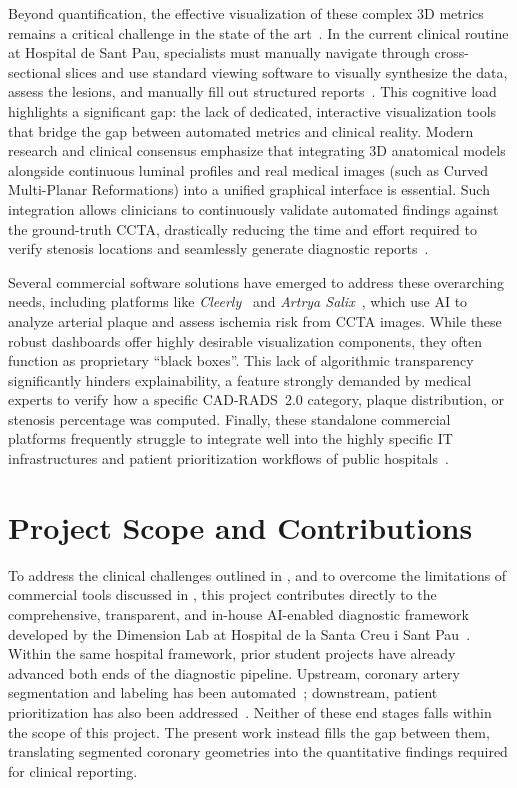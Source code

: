 Beyond quantification, the effective visualization of these complex 3D metrics remains a critical challenge in the state of the art~\cite{borkin2011}. In the current clinical routine at Hospital de Sant Pau, specialists must manually navigate through cross-sectional slices and use standard viewing software to visually synthesize the data, assess the lesions, and manually fill out structured reports~\cite{acebes2024}. This cognitive load highlights a significant gap: the lack of dedicated, interactive visualization tools that bridge the gap between automated metrics and clinical reality. Modern research and clinical consensus emphasize that integrating 3D anatomical models alongside continuous luminal profiles and real medical images (such as Curved Multi-Planar Reformations) into a unified graphical interface is essential. Such integration allows clinicians to continuously validate automated findings against the ground-truth CCTA, drastically reducing the time and effort required to verify stenosis locations and seamlessly generate diagnostic reports~\cite{borkin2011}.

Several commercial software solutions have emerged to address these overarching needs, including platforms like \emph{Cleerly}~\cite{cleerly2024} and \emph{Artrya Salix}~\cite{artrya2024}, which use AI to analyze arterial plaque and assess ischemia risk from CCTA images. While these robust dashboards offer highly desirable visualization components, they often function as proprietary ``black boxes''. This lack of algorithmic transparency significantly hinders explainability, a feature strongly demanded by medical experts to verify how a specific CAD-RADS~2.0 category, plaque distribution, or stenosis percentage was computed. Finally, these standalone commercial platforms frequently struggle to integrate well into the highly specific IT infrastructures and patient prioritization workflows of public hospitals~\cite{kelly2019}.

\section{Project Scope and Contributions}
\label{sec:scope}

To address the clinical challenges outlined in , and to overcome the limitations of commercial tools discussed in , this project contributes directly to the comprehensive, transparent, and in-house AI-enabled diagnostic framework developed by the Dimension Lab at Hospital de la Santa Creu i Sant Pau~\cite{acebes2024}. Within the same hospital framework, prior student projects have already advanced both ends of the diagnostic pipeline. Upstream, coronary artery segmentation and labeling has been automated~\cite{clapers2025}; downstream, patient prioritization has also been addressed~\cite{ferrer2024}. Neither of these end stages falls within the scope of this project. The present work instead fills the gap between them, translating segmented coronary geometries into the quantitative findings required for clinical reporting.

